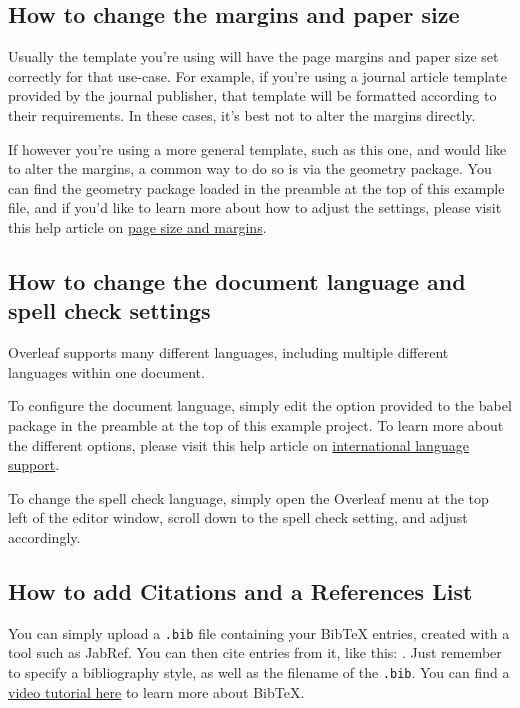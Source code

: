 \documentclass{article}
\begin{document}
      \subsection{How to change the margins and paper size}

      Usually the template you're using will have the page margins and paper
      size set correctly for that use-case. For example, if you're using a
      journal article template provided by the journal publisher, that template will
      be formatted according to their requirements. In these cases, it's best not
      to alter the margins directly.

      If however you're using a more general template, such as this one, and would
      like to alter the margins, a common way to do so is via the geometry
      package. You can find the geometry package loaded in the preamble at the top
      of this example file, and if you'd like to learn more about how to adjust
      the settings, please visit this help article on \href{https://www.overleaf.com/learn/latex/page_size_and_margins}{page
      size and margins}.

      \subsection{How to change the document language and spell check settings}

      Overleaf supports many different languages, including multiple different languages
      within one document.

      To configure the document language, simply edit the option provided to the
      babel package in the preamble at the top of this example project. To learn
      more about the different options, please visit this help article on
      \href{https://www.overleaf.com/learn/latex/International_language_support}{international
      language support}.

      To change the spell check language, simply open the Overleaf menu at the top
      left of the editor window, scroll down to the spell check setting, and adjust
      accordingly.

      \subsection{How to add Citations and a References List}

      You can simply upload a \verb|.bib| file containing your BibTeX entries, created
      with a tool such as JabRef. You can then cite entries from it, like this:
      \cite{greenwade93}. Just remember to specify a bibliography style, as well
      as the filename of the \verb|.bib|. You can find a \href{https://www.overleaf.com/help/97-how-to-include-a-bibliography-using-bibtex}{video
      tutorial here} to learn more about BibTeX.
\end{document}
